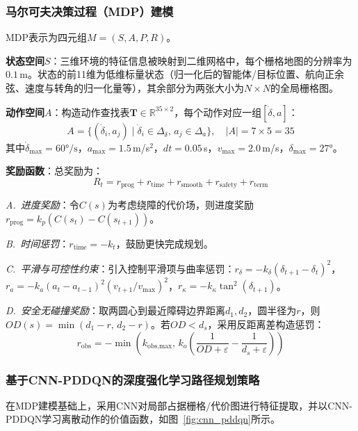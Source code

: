 \documentclass[conference]{IEEEtran}
\begin{document}
\subsubsection{马尔可夫决策过程（MDP）建模}

MDP表示为四元组$M=(S,A,P,R)$。

\textbf{状态空间}$S$：三维环境的特征信息被映射到二维网格中，每个栅格地图的分辨率为$0.1$\,m。状态的前11维为低维标量状态（归一化后的智能体/目标位置、航向正余弦、速度与转角的归一化量等），其余部分为两张大小为$N\times N$的全局栅格图。

\textbf{动作空间}$A$：构造动作查找表$\mathbf{T}\in\mathbb{R}^{35\times2}$，每个动作对应一组$[\dot{\delta}, a]$：
\begin{equation}
  A = \{(\dot{\delta}_i, a_j) \mid \dot{\delta}_i\in\Delta_{\dot{\delta}},\, a_j\in\Delta_a\},\quad |A|=7\times5=35
\end{equation}
其中$\dot{\delta}_{\max}=60°/\text{s}$，$a_{\max}=1.5$\,m/s$^2$，$dt=0.05$\,s，$v_{\max}=2.0$\,m/s，$\delta_{\max}=27°$。

\textbf{奖励函数}：总奖励为：
\begin{equation}
  R_t = r_{\text{prog}} + r_{\text{time}} + r_{\text{smooth}} + r_{\text{safety}} + r_{\text{term}}
\end{equation}

\textit{A.~进度奖励}：令$C(s)$为考虑绕障的代价场，则进度奖励$r_{\text{prog}} = k_p(C(s_t) - C(s_{t+1}))$。

\textit{B.~时间惩罚}：$r_{\text{time}} = -k_t$，鼓励更快完成规划。

\textit{C.~平滑与可控性约束}：引入控制平滑项与曲率惩罚：$r_{\delta} = -k_{\delta}(\delta_{t+1}-\delta_t)^2$，$r_a = -k_a(a_t-a_{t-1})^2(v_{t+1}/v_{\max})^2$，$r_{\kappa} = -k_{\kappa}\tan^2(\delta_{t+1})$。

\textit{D.~安全无碰撞奖励}：取两圆心到最近障碍边界距离$d_1,d_2$，圆半径为$r$，则$OD(s)=\min(d_1-r,\,d_2-r)$。若$OD<d_s$，采用反距离差构造惩罚：
\begin{equation}
  r_{\text{obs}} = -\min\!\left(k_{\text{obs,max}},\, k_o\!\left(\frac{1}{OD+\varepsilon}-\frac{1}{d_s+\varepsilon}\right)\right)
\end{equation}

\subsubsection{基于CNN-PDDQN的深度强化学习路径规划策略}

在MDP建模基础上，采用CNN对局部占据栅格/代价图进行特征提取，并以CNN-PDDQN学习离散动作的价值函数，如图~\ref{fig:cnn_pddqn}所示。
\end{document}

